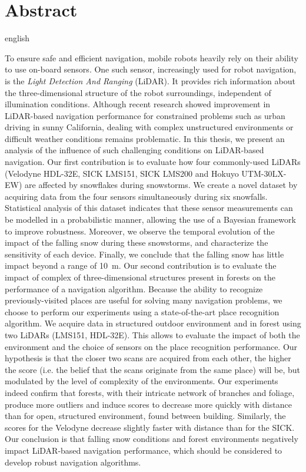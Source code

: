 \chapter*{Abstract}  

\begin{otherlanguage*}{english}

    To ensure safe and efficient navigation, mobile robots heavily rely on their ability to use on-board sensors. One such sensor, increasingly used for robot navigation, is the \emph{Light Detection And Ranging} (LiDAR). It provides rich information about the three-dimensional structure of the robot surroundings, independent of illumination conditions. Although recent research showed improvement in LiDAR-based navigation performance for constrained problems such as urban driving in sunny California, dealing with complex unstructured environments or difficult weather conditions remains problematic. In this thesis, we present an analysis of the influence of such challenging conditions on LiDAR-based navigation. Our first contribution is to evaluate how four commonly-used LiDARs (Velodyne HDL-32E, SICK LMS151, SICK LMS200 and Hokuyo UTM-30LX-EW) are affected by snowflakes during snowstorms. We create a novel dataset by acquiring data from the four sensors simultaneously during six snowfalls. Statistical analysis of this dataset indicates that these sensor measurements can be modelled in a probabilistic manner, allowing the use of a Bayesian framework to improve robustness. Moreover, we observe the temporal evolution of the impact of the falling snow during these snowstorms, and characterize the sensitivity of each device. Finally, we conclude that the falling snow has little impact beyond a range of \SI{10}{\meter}. Our second contribution is to evaluate the impact of complex of three-dimensional structures present in forests on the performance of a navigation algorithm. Because the ability to recognize previously-visited places are useful for solving many navigation problems, we choose to perform our experiments using a state-of-the-art place recognition algorithm. We acquire data in structured outdoor environment and in forest using two LiDARs (LMS151, HDL-32E). This allows to evaluate the impact of both the environment and the choice of sensors on the place recognition performance. Our hypothesis is that the closer two scans are acquired from each other, the higher the score (i.e. the belief that the scans originate from the same place) will be, but modulated by the level of complexity of the environments. Our experiments indeed confirm that forests, with their intricate network of branches and foliage, produce more outliers and induce scores to decrease more quickly with distance than for open, structured environment, found between building. Similarly, the scores for the Velodyne decrease slightly faster with distance than for the SICK. Our conclusion is that falling snow conditions and forest environments negatively impact LiDAR-based navigation performance, which should be considered to develop robust navigation algorithms.

\end{otherlanguage*} 
